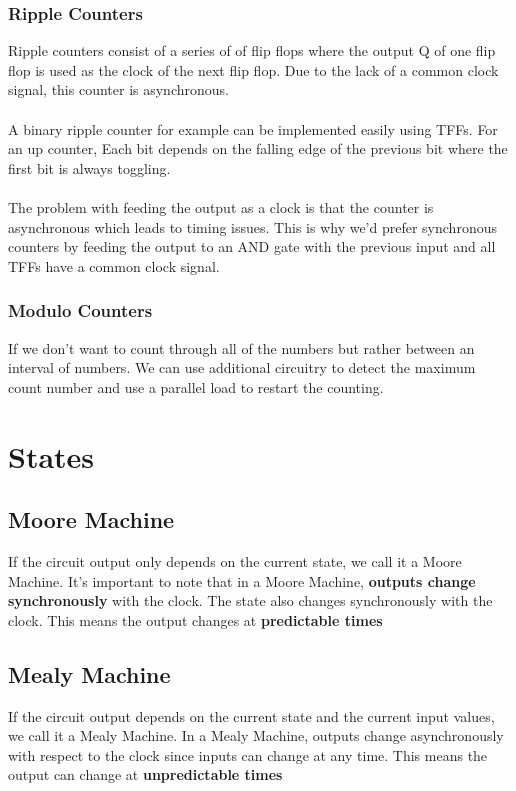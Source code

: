 \documentclass[12pt]{report}
\begin{document}
		\subsection{Ripple Counters}
			Ripple counters consist of a series of of flip flops where the output Q of one flip flop is used as the clock of the next flip flop. Due to the lack of a common clock signal, this counter is asynchronous.\\
			\\
			A binary ripple counter for example can be implemented easily using TFFs. For an up counter, Each bit depends on the falling edge of the previous bit where the first bit is always toggling.
			\\
			\\
			The problem with feeding the output as a clock is that the counter is asynchronous which leads to timing issues. This is why we'd prefer synchronous counters by feeding the output to an AND gate with the previous input and all TFFs have a common clock signal.
		\subsection{Modulo Counters}
			If we don't want to count through all of the numbers but rather between an interval of numbers. We can use additional circuitry to detect the maximum count number and use a parallel load to restart the counting.
\chapter{States}
	\section{Moore Machine}
		If the circuit output only depends on the current state, we call it a Moore Machine. It's important to note that in a Moore Machine, \textbf{outputs change synchronously} with the clock. The state also changes synchronously with the clock. This means the output changes at \textbf{predictable times}
	\section{Mealy Machine}
		If the circuit output depends on the current state and the current input values, we call it a Mealy Machine. In a Mealy Machine, outputs change asynchronously with respect to the clock since inputs can change at any time. This means the output can change at \textbf{unpredictable times}
\end{document}
